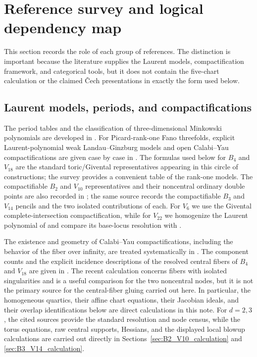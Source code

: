 \documentclass[11pt]{amsart}
\theoremstyle{definition}
\theoremstyle{remark}
\begin{document}
\section{Reference survey and logical dependency map}
\label{sec:reference_survey}

This section records the role of each group of references.  The distinction is
important because the literature supplies the Laurent models, compactification
framework, and categorical tools, but it does not contain the five-chart
calculation or the claimed Čech presentations in exactly the form used below.

\subsection{Laurent models, periods, and compactifications}

The period tables and the classification of three-dimensional Minkowski
polynomials are developed in \cite{CCGK,Minkowski}.  For Picard-rank-one Fano
threefolds, explicit Laurent-polynomial weak Landau--Ginzburg models and open
Calabi--Yau compactifications are given case by case in
\cite{PrzyjalkowskiWeak}.  The formulas used below for $B_4$ and $V_{18}$ are
the standard toric/Givental representatives appearing in this circle of
constructions; the survey \cite{PrzyjalkowskiToric} provides a convenient
table of the rank-one models.  The compactifiable $B_2$ and $V_{10}$
representatives and their noncentral ordinary double points are also recorded
in \cite{Przyjalkowski2026}; the same source records the compactifiable
$B_3$ and $V_{14}$ pencils and the two isolated contributions of each.
For $V_6$ we use the Givental complete-intersection compactification, while
for $V_{22}$ we homogenize the Laurent polynomial of
\cite{PrzyjalkowskiWeak} and compare its base-locus resolution with
\cite{Przyjalkowski2026}.

The existence and geometry of Calabi--Yau compactifications, including the
behavior of the fiber over infinity, are treated systematically in
\cite{PrzyjalkowskiCY}.  The component counts and the explicit incidence
descriptions of the resolved central fibers of $B_4$ and $V_{18}$ are given in
\cite{PrzyjalkowskiHodge}.  The recent calculation
\cite{Przyjalkowski2026} concerns fibers with isolated singularities and is a
useful comparison for the two noncentral nodes, but it is not the primary
source for the central-fiber gluing carried out here.  In particular, the
homogeneous quartics, their affine chart equations, their Jacobian ideals, and
their overlap identifications below are direct calculations in this note.
For $d=2,3$, the cited sources provide the standard resolution and node
census, while the torus equations, raw central supports, Hessians, and the
displayed local blowup calculations are carried out directly in
Sections~\ref{sec:B2_V10_calculation} and
\ref{sec:B3_V14_calculation}.
\end{document}
